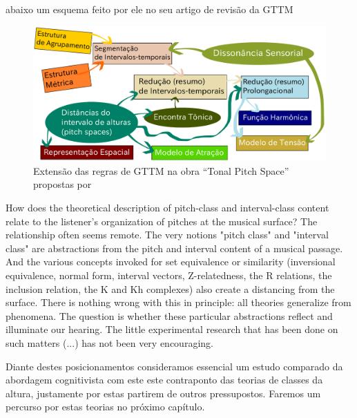 \documentclass[
	12pt,				%
	openright,			%
	twoside,			%
	a4paper,			%
	english,			%
	french,				%
	spanish,			%
	brazil				%
	]{abntex2}
\begin{document}
abaixo um esquema feito por ele no seu artigo de revisão da GTTM
\begin{figure}[!h]
	\caption{\label{fig_grafico}Extensão das regras de GTTM na obra “Tonal Pitch Space” propostas por  }
	\begin{center}
	    \includegraphics[scale=0.5]{gttm/GTTM_TPS_rules.pdf}
	\end{center}
\end{figure}

\begin{citacao}
How does the theoretical description of pitch-class and interval-class content relate to the listener's organization of pitches at the musical surface? The relationship often seems
remote. The very notions "pitch class" and "interval class" are abstractions from
the pitch and interval content of a musical passage. And the various concepts
invoked for set equivalence or similarity (inversional equivalence, normal form,
interval vectors, Z-relatedness, the R relations, the inclusion relation, the K and
Kh complexes) also create a distancing from the surface. There is nothing wrong
with this in principle: all theories generalize from phenomena. The question is
whether these particular abstractions reflect and illuminate our hearing. The little
experimental research that has been done on such matters (...) has not been very encouraging.
\cite{lerdahl1989atonal}
\end{citacao}

Diante destes posicionamentos consideramos essencial um estudo comparado da abordagem cognitivista com este este contraponto das teorias de classes da altura, justamente por estas partirem de outros pressupostos. Faremos um percurso por estas teorias no próximo capítulo.
\end{document}
